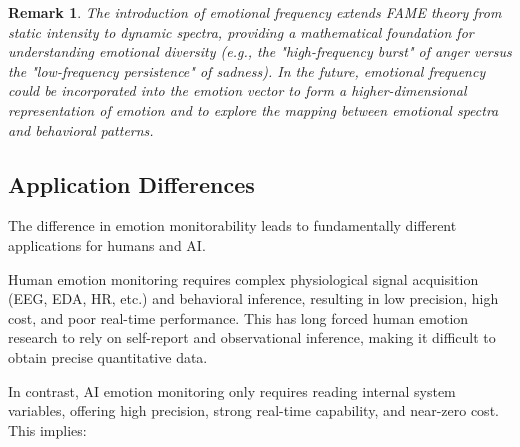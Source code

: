 \documentclass[12pt,a4paper]{article}
\theoremstyle{plain}
\newtheorem{remark}{Remark}[section]
\begin{document}
\begin{remark}
The introduction of emotional frequency extends FAME theory from static intensity to dynamic spectra, providing a mathematical foundation for understanding emotional diversity (e.g., the "high-frequency burst" of anger versus the "low-frequency persistence" of sadness). In the future, emotional frequency could be incorporated into the emotion vector to form a higher-dimensional representation of emotion and to explore the mapping between emotional spectra and behavioral patterns.
\end{remark}

\subsection{Application Differences}

The difference in emotion monitorability leads to fundamentally different applications for humans and AI.

Human emotion monitoring requires complex physiological signal acquisition (EEG, EDA, HR, etc.) and behavioral inference, resulting in low precision, high cost, and poor real-time performance. This has long forced human emotion research to rely on self-report and observational inference, making it difficult to obtain precise quantitative data.

In contrast, AI emotion monitoring only requires reading internal system variables, offering high precision, strong real-time capability, and near-zero cost. This implies:
\end{document}
